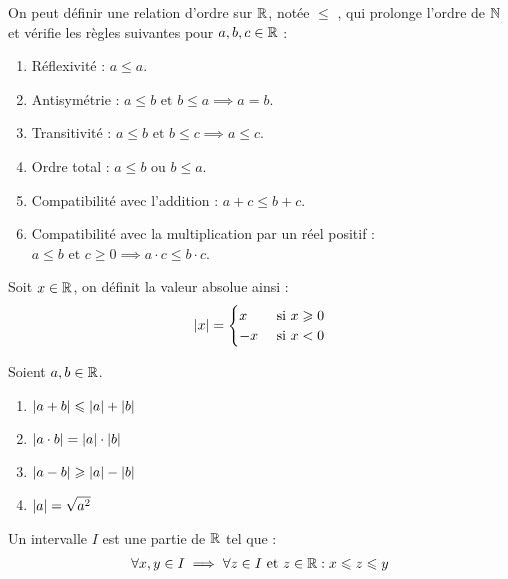 \begin{proposition}
    On peut définir une relation d'ordre sur $\mathbb{R}$, notée \og $\leq$ \fg, qui prolonge l'ordre de $\mathbb{N}$ et vérifie les règles suivantes pour $a, b, c \in \mathbb{R}$ :
    \begin{enumerate}
        \item Réflexivité : $a \leq a$.
        \item Antisymétrie : $a \leq b \text{ et } b \leq a \implies a = b$.
        \item Transitivité : $a \leq b \text{ et } b \leq c \implies a \leq c$.
        \item Ordre total : $a \leq b \text{ ou } b \leq a$.
        \item Compatibilité avec l'addition : $a + c \leq b + c$.
        \item Compatibilité avec la multiplication par un réel positif : $a \leq b \text{ et } c \geq 0 \implies a \cdot c \leq b \cdot c$.
    \end{enumerate}
\end{proposition}

\begin{definition}
    Soit $x \in \mathbb{R}$, on définit la valeur absolue ainsi :
    \begin{align*}
        \abs{x} =
        \begin{cases}
            x &\text{ si } x \geqslant 0 \\
            -x &\text{ si } x < 0
        \end{cases}
    \end{align*}
\end{definition}

\begin{proposition}
   	Soient $a, b \in \mathbb{R}$.
    \begin{enumerate}
            \item $\abs{a + b} \leqslant \abs{a} + \abs{b}$
            \item $\abs{a \cdot b} = \abs{a} \cdot \abs{b}$
            \item $\abs{a - b} \geqslant \abs{a} - \abs{b}$
            \item $\abs{a} = \sqrt{a^2}$
        \end{enumerate}
\end{proposition}

\begin{definition}[Intervalle]
    Un intervalle $I$ est une partie de $\mathbb{R}$ tel que :
    \begin{align*}
        \forall x, y \in I \implies \forall z \in I \text{ et } z \in \mathbb{R} : x \leqslant z \leqslant y
    \end{align*}
\end{definition}

